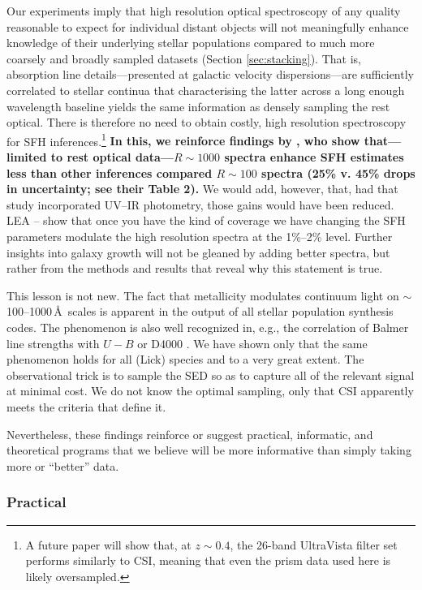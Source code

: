 \documentclass[a4paper,fleqn,usenatbib]{mnras}
\newcommand{\bfr}{\bf\color{red}}
\newcommand{\bfb}{\color{myblue}}
\begin{document}
Our experiments imply that high resolution optical spectroscopy of any quality reasonable
to expect for individual distant objects will not meaningfully 
enhance knowledge of their underlying stellar populations compared to much more coarsely and broadly 
sampled datasets (Section \ref{sec:stacking}). That is, absorption line 
details---presented at galactic velocity dispersions---are sufficiently correlated to 
stellar continua that characterising the latter across a long enough wavelength baseline 
yields the same information as densely sampling the rest optical. There is therefore no need to obtain 
costly, high resolution spectroscopy for SFH inferences.\footnote{A future 
paper will show that, at $z\sim0.4$, the 26-band UltraVista filter set \citep{Muzzin13} performs 
similarly to CSI, meaning that even the prism data used here is likely oversampled.}
{\bfr In this, we reinforce findings by \citet{Pacifici12}, who show that---limited to 
rest optical data---$R\sim1000$ spectra enhance SFH estimates less than other inferences 
compared $R\sim100$ spectra (25\% v. 45\% drops in uncertainty; see their Table 2).} 
We would add, however, that, had that study incorporated UV--IR photometry, 
those gains would have been reduced. {\bfb LEA -- \citep{Leja19, Lower20} show that once you have
the kind of coverage we have changing the SFH parameters modulate the high resolution
spectra at the 1\%--2\% level.}
Further insights into galaxy growth will not be gleaned by adding better spectra, but rather
from the methods and results that reveal why this statement is true.

This lesson is not new. The fact that metallicity modulates continuum light on 
$\sim$100--1000\,\AA\ scales is apparent in the output of all stellar population synthesis codes. 
The phenomenon is also well recognized in, e.g., the correlation of Balmer line strengths with 
$U-B$ or D4000 \citep[e.g.,][]{Kauffmann03,CidFernandes05}. We have shown only that the same
phenomenon holds for all (Lick) species and to a very great extent. The observational trick is to sample 
the SED so as to capture all of the relevant signal at minimal cost. We do not know the optimal sampling,
 only that CSI apparently meets the criteria that define it.

Nevertheless, these findings reinforce or suggest practical, informatic, and 
theoretical programs that we believe will be more informative than simply taking more or
``better'' data.

\subsubsection{Practical}
\end{document}
